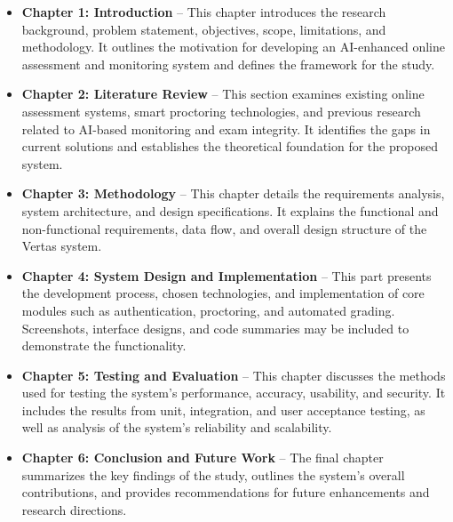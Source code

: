 \begin{itemize}
    \item \textbf{Chapter 1: Introduction} – This chapter introduces the research background, problem statement, objectives, scope, limitations, and methodology. It outlines the motivation for developing an AI-enhanced online assessment and monitoring system and defines the framework for the study.
    \item \textbf{Chapter 2: Literature Review} – This section examines existing online assessment systems, smart proctoring technologies, and previous research related to AI-based monitoring and exam integrity. It identifies the gaps in current solutions and establishes the theoretical foundation for the proposed system.
    \item \textbf{Chapter 3: Methodology} – This chapter details the requirements analysis, system architecture, and design specifications. It explains the functional and non-functional requirements, data flow, and overall design structure of the Vertas system.
    \item \textbf{Chapter 4: System Design and Implementation} – This part presents the development process, chosen technologies, and implementation of core modules such as authentication, proctoring, and automated grading. Screenshots, interface designs, and code summaries may be included to demonstrate the functionality.
    \item \textbf{Chapter 5: Testing and Evaluation} – This chapter discusses the methods used for testing the system’s performance, accuracy, usability, and security. It includes the results from unit, integration, and user acceptance testing, as well as analysis of the system’s reliability and scalability.
    \item \textbf{Chapter 6: Conclusion and Future Work} – The final chapter summarizes the key findings of the study, outlines the system’s overall contributions, and provides recommendations for future enhancements and research directions.
\end{itemize}